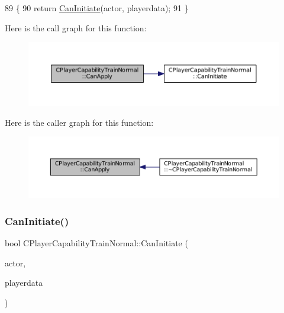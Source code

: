 \begin{DoxyCode}
89                                                                                                            
                                                        \{
90     \textcolor{keywordflow}{return} \hyperlink{classCPlayerCapabilityTrainNormal_ac49cf646b94220844a03b7c3a8a7f215}{CanInitiate}(actor, playerdata);
91 \}
\end{DoxyCode}
Here is the call graph for this function\+:\nopagebreak
\begin{figure}[H]
\begin{center}
\leavevmode
\includegraphics[width=350pt]{classCPlayerCapabilityTrainNormal_a625d2154bed47357f45662fe5dee7c1b_cgraph}
\end{center}
\end{figure}
Here is the caller graph for this function\+:\nopagebreak
\begin{figure}[H]
\begin{center}
\leavevmode
\includegraphics[width=350pt]{classCPlayerCapabilityTrainNormal_a625d2154bed47357f45662fe5dee7c1b_icgraph}
\end{center}
\end{figure}
\hypertarget{classCPlayerCapabilityTrainNormal_ac49cf646b94220844a03b7c3a8a7f215}{}\label{classCPlayerCapabilityTrainNormal_ac49cf646b94220844a03b7c3a8a7f215} 
\subsubsection{\texorpdfstring{Can\+Initiate()}{CanInitiate()}}
{\footnotesize\ttfamily bool C\+Player\+Capability\+Train\+Normal\+::\+Can\+Initiate (\begin{DoxyParamCaption}\item[{std\+::shared\+\_\+ptr$<$ \hyperlink{classCPlayerAsset}{C\+Player\+Asset} $>$}]{actor,  }\item[{std\+::shared\+\_\+ptr$<$ \hyperlink{classCPlayerData}{C\+Player\+Data} $>$}]{playerdata }\end{DoxyParamCaption})\hspace{0.3cm}{\ttfamily [virtual]}}




